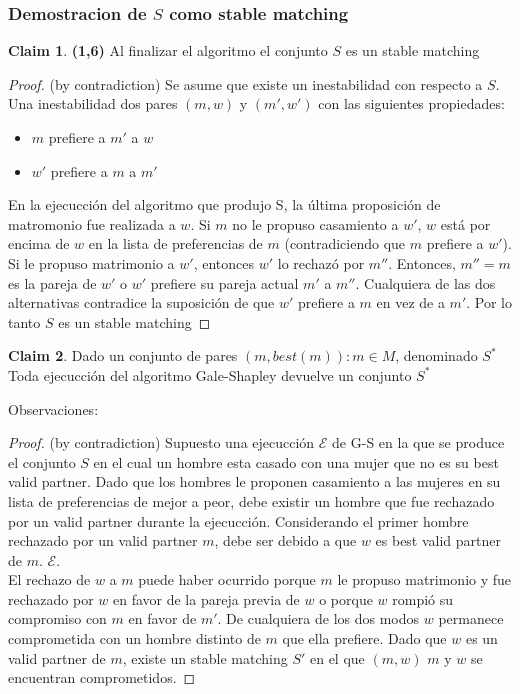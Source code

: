 \documentclass[12pt, fleqn]{article}
\theoremstyle{remark}
\theoremstyle{definition}
\newtheorem*{definition}{Claim}
\begin{document}
\subsubsection{Demostracion de $S$ como stable matching}
\begin{definition}
    \textbf{(1,6)} Al finalizar el algoritmo el conjunto $S$ es un stable matching
\end{definition}
\begin{proof}
  (by contradiction) Se asume que existe un inestabilidad con respecto a $S$.
  Una inestabilidad dos pares $(m,w)$ y $(m',w')$ con las siguientes propiedades:
  \begin{itemize}
      \item $m$ prefiere a $m'$ a $w$
      \item $w'$ prefiere a $m$ a $m'$ 
  \end{itemize}
   En la ejecucción del algoritmo que produjo S, la última proposición de matromonio
   fue realizada a $w$. Si $m$ no le propuso casamiento a $w'$, $w$ está por encima de $w$
   en la lista de preferencias de $m$ (contradiciendo que $m$ prefiere a $w'$).
   Si le propuso matrimonio a $w'$, entonces $w'$ lo rechazó por $m''$.
   Entonces, $m''=m$ es la pareja de $w'$ o $w'$ prefiere su pareja actual $m'$ a $m''$.
   Cualquiera de las dos alternativas contradice la suposición de que $w'$ prefiere a $m$
   en vez de a $m'$. Por lo tanto $S$ es un stable matching
\end{proof}
\begin{definition}
   Dado un conjunto de pares ${(m, best(m)): m \in M}$, denominado $S^*$ 
   Toda ejecucción del algoritmo Gale-Shapley devuelve un conjunto $S^*$
\end{definition}
Observaciones:
\begin{proof}
   (by contradiction) Supuesto una ejecucción $\mathcal{E}$ de G-S en la que se produce
   el conjunto $S$ en el cual un hombre esta casado con una mujer que no es su best valid 
   partner. Dado que los hombres le proponen casamiento a las mujeres en su lista de 
   preferencias de mejor a peor, debe existir un hombre que fue rechazado por un 
   valid partner durante la ejecucción.
   Considerando el primer hombre rechazado por un valid partner $m$, debe ser debido
   a que $w$ es best valid partner de $m$.
   $\mathcal{E}$.\\
   El rechazo de $w$ a $m$ puede haber ocurrido porque $m$ le propuso matrimonio
   y fue rechazado por $w$ en favor de la pareja previa de $w$ o porque $w$
   rompió su compromiso con $m$ en favor de $m'$. De cualquiera de los dos modos
   $w$ permanece comprometida con un hombre distinto de $m$ que ella prefiere.
   Dado que $w$ es un valid partner de $m$, existe un stable matching $S'$ en el que 
   $(m,w)$ $m$ y $w$ se encuentran comprometidos.
\end{proof}
\end{document}
